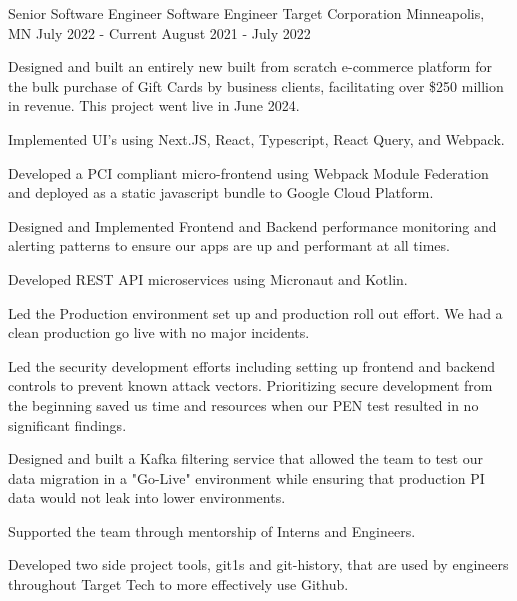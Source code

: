 

\begin{cventries}

  \cventrytarget
    {Senior Software Engineer} %
    {Software Engineer} %
    {Target Corporation}
    {Minneapolis, MN} %
    {July 2022 - Current} %
    {August 2021 - July 2022} %
    {
      \begin{cvitems} %
        \item {Designed and built an entirely new built from scratch e-commerce platform for the bulk purchase of Gift Cards by business clients, facilitating over \$250 million in revenue. This project went live in June 2024.}
        \item {Implemented UI's using Next.JS, React, Typescript, React Query, and Webpack.}
        \item {Developed a PCI compliant micro-frontend using Webpack Module Federation and deployed as a static javascript bundle to Google Cloud Platform.}
        \item {Designed and Implemented Frontend and Backend performance monitoring and alerting patterns to ensure our apps are up and performant at all times.}
        \item {Developed REST API microservices using Micronaut and Kotlin.}
        \item {Led the Production environment set up and production roll out effort. We had a clean production go live with no major incidents.}
        \item {Led the security development efforts including setting up frontend and backend controls to prevent known attack vectors. Prioritizing secure development from the beginning saved us time and resources when our PEN test resulted in no significant findings.}
        \item {Designed and built a Kafka filtering service that allowed the team to test our data migration in a "Go-Live" environment while ensuring that production PI data would not leak into lower environments.}
        \item {Supported the team through mentorship of Interns and Engineers.}
        \item {Developed two side project tools, git1s and git-history, that are used by engineers throughout Target Tech to more effectively use Github.}
      \end{cvitems}
    }


\end{cventries}
